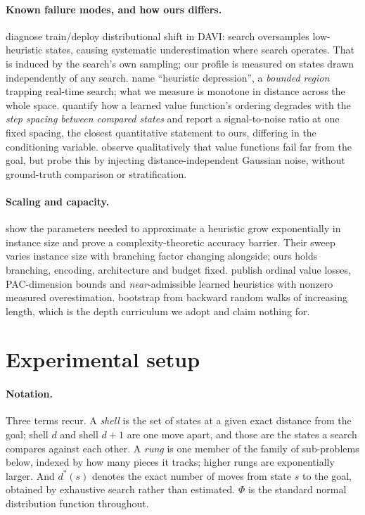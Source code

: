 \documentclass{article}
\begin{document}
\paragraph{Known failure modes, and how ours differs.}
\citet{hadar2026} diagnose train/deploy distributional shift in DAVI: search
oversamples low-heuristic states, causing systematic underestimation where search
operates. That is induced by the search's own sampling; our profile is measured on
states drawn independently of any search. \citet{hernandez2012} name ``heuristic
depression'', a \emph{bounded region} trapping real-time search; what we measure is
monotone in distance across the whole space. \citet{czechowski2021} quantify how a
learned value function's ordering degrades with the \emph{step spacing between
compared states} and report a signal-to-noise ratio at one fixed spacing, the
closest quantitative statement to ours, differing in the conditioning variable.
\citet{zawalski2024} observe qualitatively that value functions fail far from the
goal, but probe this by injecting distance-independent Gaussian noise, without
ground-truth comparison or stratification.

\paragraph{Scaling and capacity.} \citet{pendurkar2023} show the parameters needed
to approximate a heuristic grow exponentially in instance size and prove a
complexity-theoretic accuracy barrier. Their sweep varies instance size with
branching factor changing alongside; ours holds branching, encoding, architecture
and budget fixed. \citet{futuhi2026} publish ordinal value losses, PAC-dimension
bounds and \emph{near}-admissible learned heuristics with nonzero measured
overestimation. \citet{arfaee2011} bootstrap from backward random walks of
increasing length, which is the depth curriculum we adopt and claim nothing for.

\section{Experimental setup}
\label{sec:setup}

\paragraph{Notation.} Three terms recur. A \emph{shell} is the set of states at a
given exact distance from the goal; shell $d$ and shell $d+1$ are one move apart,
and those are the states a search compares against each other. A \emph{rung} is
one member of the family of sub-problems below, indexed by how many pieces it
tracks; higher rungs are exponentially larger. And $d^*(s)$ denotes the exact
number of moves from state $s$ to the goal, obtained by exhaustive search rather
than estimated. $\Phi$ is the standard normal distribution function throughout.
\end{document}
